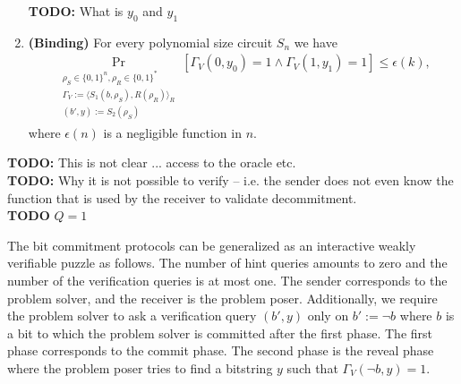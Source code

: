 \begin{definition}
\begin{enumerate}[]
  \begin{todo}
    \textbf{TODO:} What is $y_0$ and $y_1$
  \end{todo}
\item{\textnormal{\textbf{(Binding)}}}
  For every polynomial size circuit $S_n$ we have
  \begin{align*}
    \underset{\substack{
        \rho_S \in \{0,1\}^{n}, \rho_R \in \{0,1\}^{*} \\
        \Gamma_V := \langle S_1(b,\rho_S), R(\rho_R) \rangle_{R} \\ (b',y) := S_2(\rho_S)}}{\Pr}[\Gamma_V(0,y_0) = 1 \land \Gamma_V(1,y_1) = 1] \leq \epsilon(k),
  \end{align*}
  where $\epsilon(n)$ is a negligible function in $n$.
\end{enumerate}
\end{definition}

\begin{todo}
  \textbf{TODO:} This is not clear ... access to the oracle etc.\\
  \textbf{TODO:} Why it is not possible to verify -- i.e. the sender does not even
  know the function that is used by the receiver to validate decommitment.\\
  \textbf{TODO} $Q=1$
\end{todo}

The bit commitment protocols can be generalized as an interactive weakly verifiable puzzle as follows.
The number of hint queries amounts to zero and the number of the verification queries is at most one.
The sender corresponds to the problem solver, and the receiver is the problem poser.
Additionally, we require the problem solver to ask a verification query $(b',y)$ only on $b' := \lnot b$ where $b$
is a bit to which the problem solver is committed after the first phase.
The first phase corresponds to the commit phase.
The second phase is the reveal phase where the problem poser tries to find a bitstring $y$ such that $\Gamma_V(\lnot b, y) = 1$.

